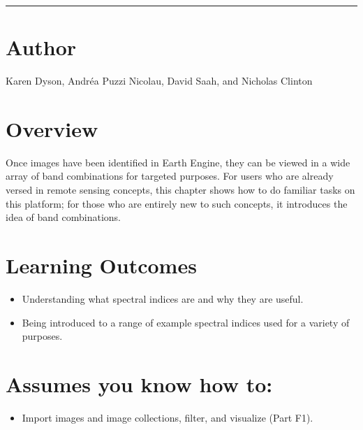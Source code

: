 \documentclass[
  letterpaper,
  DIV=11,
  numbers=noendperiod]{scrreprt}
\providecommand{\tightlist}{%
  \setlength{\itemsep}{0pt}\setlength{\parskip}{0pt}}\usepackage{longtable,booktabs,array}
\begin{document}
\begin{center}\rule{0.5\linewidth}{0.5pt}\end{center}

\hypertarget{author-2}{%
\section*{Author}\label{author-2}}


Karen Dyson, Andréa Puzzi Nicolau, David Saah, and Nicholas Clinton

\hypertarget{overview-4}{%
\section*{Overview}\label{overview-4}}


Once images have been identified in Earth Engine, they can be viewed in
a wide array of band combinations for targeted purposes. For users who
are already versed in remote sensing concepts, this chapter shows how to
do familiar tasks on this platform; for those who are entirely new to
such concepts, it introduces the idea of band combinations.

\hypertarget{learning-outcomes-4}{%
\section*{Learning Outcomes}\label{learning-outcomes-4}}


\begin{itemize}
\tightlist
\item
  Understanding what spectral indices are and why they are useful.
\item
  Being introduced to a range of example spectral indices used for a
  variety of purposes.
\end{itemize}

\hypertarget{assumes-you-know-how-to-4}{%
\section*{Assumes you know how to:}\label{assumes-you-know-how-to-4}}


\begin{itemize}
\tightlist
\item
  Import images and image collections, filter, and visualize (Part F1).
\end{itemize}
\end{document}
